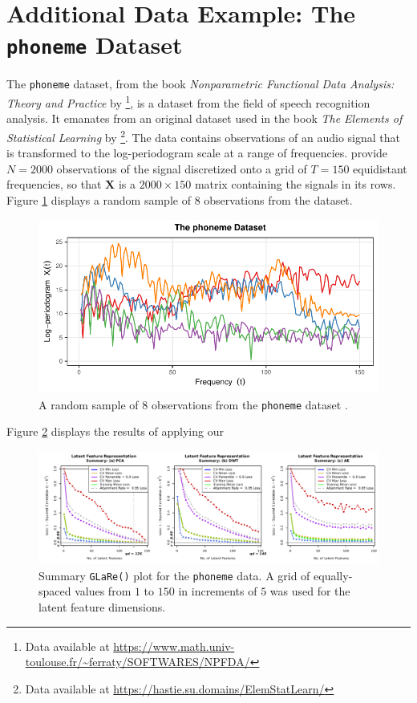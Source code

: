 \section{Additional Data Example: The \texttt{phoneme} Dataset}\label{sec:additional-data}

The \texttt{phoneme} dataset, from the book \emph{Nonparametric Functional Data Analysis: Theory and Practice} by \textcite{ferraty_nonparametric_2006}\footnote{Data available at \url{https://www.math.univ-toulouse.fr/~ferraty/SOFTWARES/NPFDA/}}, is a dataset from the field of speech recognition analysis.
It emanates from an original dataset used in the book \emph{The Elements of Statistical Learning} by \textcite{hastie_elements_2009}\footnote{Data available at \url{https://hastie.su.domains/ElemStatLearn/}}.
The data contains observations of an audio signal that is transformed to the log-periodogram scale at a range of frequencies.
\textcite{ferraty_nonparametric_2006} provide $N=2000$ observations of the signal discretized onto a grid of $T=150$ equidistant frequencies, so that $\mathbf{X}$ is a $2000\times 150$ matrix containing the signals in its rows.
Figure \ref{fig:phoneme} displays a random sample of $8$ observations from the dataset.

\begin{figure}[h]
    \centering
    \includegraphics[width=0.75\linewidth]{figures/phoneme.pdf}
    \caption{A random sample of $8$ observations from the \texttt{phoneme} dataset \parencite{hastie_elements_2009, ferraty_nonparametric_2006}.}
    \label{fig:phoneme}
\end{figure}

Figure \ref{fig:phoneme-results} displays the results of applying our \pr

\begin{figure}
    \centering
    \includegraphics[width=1\linewidth]{figures/phoneme-results.pdf}
    \caption{Summary \texttt{GLaRe()} plot for the \texttt{phoneme} data. A grid of equally-spaced values from $1$ to $150$ in increments of $5$ was used for the latent feature dimensions.}
    \label{fig:phoneme-results}
\end{figure}